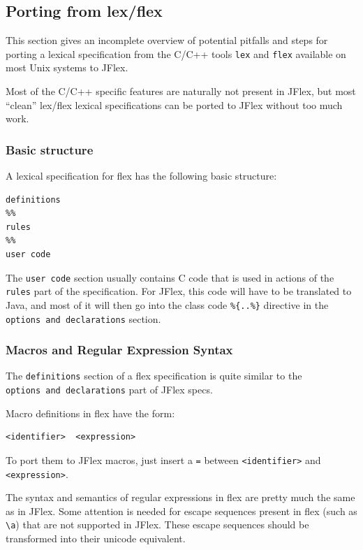 \subsection{Porting from lex/flex}\label{porting-from-lexflex}

This section gives an incomplete overview of potential pitfalls and
steps for porting a lexical specification from the C/C++ tools
\texttt{lex} and \texttt{flex} \autocite{flex} available on most Unix
systems to JFlex.

Most of the C/C++ specific features are naturally not present in JFlex,
but most ``clean'' lex/flex lexical specifications can be ported to
JFlex without too much work.

\subsubsection{Basic structure}\label{basic-structure}

A lexical specification for flex has the following basic structure:

\begin{verbatim}
definitions
%%
rules
%%
user code
\end{verbatim}

The \texttt{user\ code} section usually contains C code that is used in
actions of the \texttt{rules} part of the specification. For JFlex, this
code will have to be translated to Java, and most of it will then go
into the class code \texttt{\%\{..\%\}} directive in the
\texttt{options\ and\ declarations} section.

\subsubsection{Macros and Regular Expression
Syntax}\label{macros-and-regular-expression-syntax}

The \texttt{definitions} section of a flex specification is quite
similar to the \texttt{options\ and\ declarations} part of JFlex specs.

Macro definitions in flex have the form:

\begin{verbatim}
<identifier>  <expression>
\end{verbatim}

To port them to JFlex macros, just insert a \texttt{=} between
\texttt{\textless{}identifier\textgreater{}} and
\texttt{\textless{}expression\textgreater{}}.

The syntax and semantics of regular expressions in flex are pretty much
the same as in JFlex. Some attention is needed for escape sequences
present in flex (such as \texttt{\textbackslash{}a}) that are not
supported in JFlex. These escape sequences should be transformed into
their unicode equivalent.

